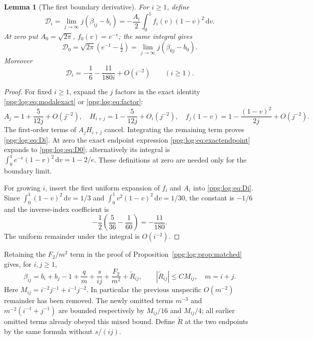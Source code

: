 \documentclass[11pt,letterpaper]{article}
\newtheorem{lemma}[theorem]{Lemma}
\theoremstyle{remark}\newtheorem{remark}[theorem]{Remark}
\numberwithin{equation}{section}
\newcommand{\dd}{\mathrm d}
\begin{document}
\begin{lemma}[The first boundary derivative]\label{ppg:log:lem:boundaryderivative}
For $i\ge1$, define
\begin{equation}\label{ppg:log:eq:Di}
 \mathcal D_i=\lim_{j\to\infty}j(\beta_{ij}-b_i)
       =-\frac{A_i}2\int_0^1f_i(v)(1-v)^2\,\dd v.
\end{equation}
At zero put $A_0=\sqrt{2\pi}$, $f_0(v)=e^{-v}$; the same integral gives
\begin{equation}\label{ppg:log:eq:D0}
 \mathcal D_0=\sqrt{2\pi}(e^{-1}-\tfrac12)
             =\lim_{j\to\infty}j(\beta_{0j}-b_0).
\end{equation}
Moreover
\begin{equation}\label{ppg:log:eq:Dexp}
 \mathcal D_i=-\frac16-\frac{11}{180i}+O(i^{-2})\qquad(i\ge1).
\end{equation}
\end{lemma}
\begin{proof}
For fixed $i\ge1$, expand the $j$ factors in the exact identity \eqref{ppg:log:eq:modalexact} or \eqref{ppg:log:eq:factor}:
\[
 A_j=1+\frac5{12j}+O(j^{-2}),\quad
 H_{i+j}=1-\frac5{12j}+O_i(j^{-2}),\quad
 f_j(1-v)=1-\frac{(1-v)^2}{2j}+O(j^{-2}).
\]
The first-order terms of $A_jH_{i+j}$ cancel. Integrating the remaining term proves \eqref{ppg:log:eq:Di}. At zero the exact endpoint expression \eqref{ppg:log:eq:exactendpoint} expands to \eqref{ppg:log:eq:D0}; alternatively its integral is $\int_0^1e^{-v}(1-v)^2\,\dd v=1-2/e$. These definitions at zero are needed only for the boundary limit.

For growing $i$, insert the first uniform expansion of $f_i$ and $A_i$ into \eqref{ppg:log:eq:Di}. Since $\int_0^1(1-v)^2\,\dd v=1/3$ and $\int_0^1v^2(1-v)^2\,\dd v=1/30$, the constant is $-1/6$ and the inverse-index coefficient is
\[
 -\frac12\left(\frac5{36}-\frac1{60}\right)=-\frac{11}{180}.
\]
The uniform remainder under the integral is $O(i^{-2})$.
\end{proof}

Retaining the $F_2/m^2$ term in the proof of Proposition~\ref{ppg:log:prop:matched} gives, for $i,j\ge1$,
\begin{equation}\label{ppg:log:eq:matchedsecond}
 \beta_{ij}=b_i+b_j-1+\frac q m+\frac s{ij}+\frac{F_2}{m^2}
                    +\widetilde R_{ij},\qquad
 |\widetilde R_{ij}|\le C M_{ij},\quad m=i+j.
\end{equation}
Here $M_{ij}=i^{-2}j^{-1}+i^{-1}j^{-2}$. In particular the previous unspecific $O(m^{-2})$ remainder has been removed. The newly omitted terms $m^{-3}$ and $m^{-2}(i^{-1}+j^{-1})$ are bounded respectively by $M_{ij}/16$ and $M_{ij}/4$; all earlier omitted terms already obeyed this mixed bound. Define $\widetilde R$ at the two endpoints by the same formula without $s/(ij)$.
\end{document}
